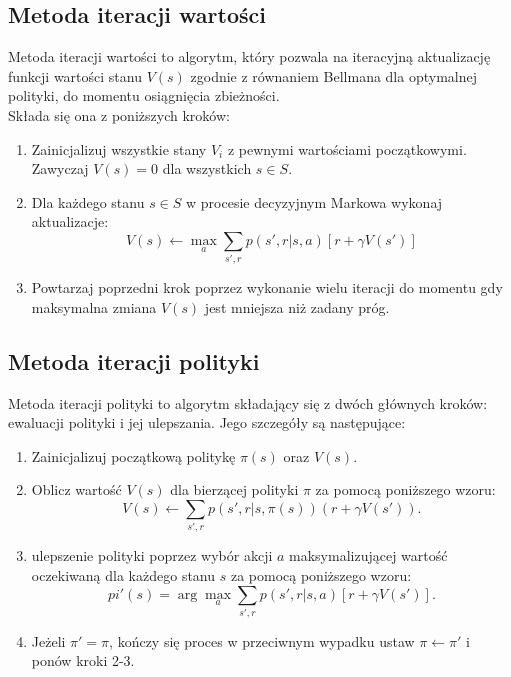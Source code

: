 \documentclass[a4paper, 12pt]{article}
\numberwithin{equation}{section}
\begin{document}
    \subsection{Metoda iteracji wartości}
    Metoda iteracji wartości to algorytm, który pozwala na iteracyjną aktualizację funkcji wartości stanu \( V(s) \) zgodnie z równaniem Bellmana dla optymalnej polityki, do momentu osiągnięcia zbieżności.
    \\ Składa się ona z poniższych kroków:
    \begin{enumerate}
        \item Zainicjalizuj wszystkie stany \( V_i \) z pewnymi wartościami początkowymi. Zawyczaj \( V(s) = 0 \) dla wszystkich \( s \in S \).
        \item Dla każdego stanu \( s \in S \) w procesie decyzyjnym Markowa wykonaj aktualizacje:
        \begin{equation}
        V(s) \leftarrow \max_a \sum_{s',r} p(s',r|s,a)[r + \gamma V(s')]
        \end{equation}
        \item Powtarzaj poprzedni krok poprzez wykonanie wielu iteracji do momentu gdy maksymalna zmiana \( V(s) \) jest mniejsza niż zadany próg. 
    \end{enumerate}
    \subsection{Metoda iteracji polityki}
    Metoda iteracji polityki to algorytm składający się z dwóch głównych kroków: ewaluacji polityki i jej ulepszania. Jego szczegóły są następujące:
    \begin{enumerate} 
        \item Zainicjalizuj początkową politykę \( \pi(s) \) oraz \( V(s) \).
        \item Oblicz wartość \( V(s) \) dla bierzącej polityki \( \pi \) za pomocą poniższego wzoru:
        \begin{equation}
        V(s) \leftarrow \sum_{s',r} p(s',r|s,\pi(s))(r + \gamma V(s')).
        \end{equation}
        \item ulepszenie polityki poprzez wybór akcji \( a \) maksymalizującej wartość oczekiwaną dla każdego stanu \( s \) za pomocą poniższego wzoru:
        \begin{equation}
        pi'(s) = \arg\max_{a} \sum_{s',r} p(s',r|s,a) [r + \gamma V(s')].
        \end{equation}
        \item Jeżeli \( \pi' = \pi \), kończy się proces w przeciwnym wypadku ustaw \( \pi \leftarrow \pi' \) i ponów kroki 2-3.
    \end{enumerate}
\end{document}
